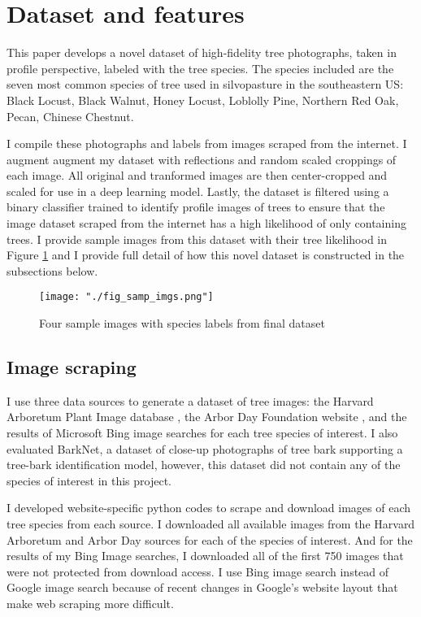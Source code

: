\documentclass[10pt,twocolumn,letterpaper]{article}
\begin{document}
\section{Dataset and features}
\label{sec:data}
This paper develops a novel dataset of high-fidelity tree photographs, taken in profile perspective, labeled with the tree species. The species included are the seven most common species of tree used in silvopasture in the southeastern US: Black Locust, Black Walnut, Honey Locust, Loblolly Pine, Northern Red Oak, Pecan, Chinese Chestnut. 

I compile these photographs and labels from images scraped from the internet. I augment augment my dataset with reflections and random scaled croppings of each image. All original and tranformed images are then center-cropped and scaled for use in a deep learning model. Lastly, the dataset is filtered using a binary classifier trained to identify profile images of trees to ensure that the image dataset scraped from the internet has a high likelihood of only containing trees. I provide sample images from this dataset with their tree likelihood in Figure \ref{fig:samp_imgs} and I provide full detail of how this novel dataset is constructed in the subsections below.

\begin{figure}[!htbp]
  \centering
  \texttt{[image: "./fig\_samp\_imgs.png"]}
  \caption{\label{fig:samp_imgs} Four sample images with species labels from final dataset}
\end{figure}

\subsection{Image scraping}

I use three data sources to generate a dataset of tree images: the Harvard Arboretum Plant Image database \cite{harvard}, the Arbor Day Foundation website \cite{arborday}, and the results of Microsoft Bing image searches for each tree species of interest. I also evaluated BarkNet, a dataset of close-up photographs of tree bark supporting a tree-bark identification model, however, this dataset did not contain any of the species of interest in this project.

I developed website-specific python codes to scrape and download images of each tree species from each source. I downloaded all available images from the Harvard Arboretum and Arbor Day sources for each of the species of interest. And for the results of my Bing Image searches, I downloaded all of the first 750 images that were not protected from download access. I use Bing image search instead of Google image search because of recent changes in Google's website layout that make web scraping more difficult.
\end{document}
